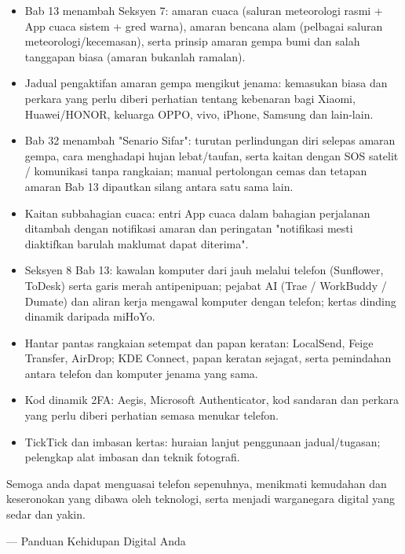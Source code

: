 
\begin{itemize}
  \item Bab 13 menambah Seksyen 7: amaran cuaca (saluran meteorologi rasmi + App cuaca sistem + gred warna), amaran bencana alam (pelbagai saluran meteorologi/kecemasan), serta prinsip amaran gempa bumi dan salah tanggapan biasa (amaran bukanlah ramalan).
  \item Jadual pengaktifan amaran gempa mengikut jenama: kemasukan biasa dan perkara yang perlu diberi perhatian tentang kebenaran bagi Xiaomi, Huawei/HONOR, keluarga OPPO, vivo, iPhone, Samsung dan lain-lain.
  \item Bab 32 menambah "Senario Sifar": turutan perlindungan diri selepas amaran gempa, cara menghadapi hujan lebat/taufan, serta kaitan dengan SOS satelit / komunikasi tanpa rangkaian; manual pertolongan cemas dan tetapan amaran Bab 13 dipautkan silang antara satu sama lain.
  \item Kaitan subbahagian cuaca: entri App cuaca dalam bahagian perjalanan ditambah dengan notifikasi amaran dan peringatan "notifikasi mesti diaktifkan barulah maklumat dapat diterima".
\end{itemize}


\begin{itemize}
  \item Seksyen 8 Bab 13: kawalan komputer dari jauh melalui telefon (Sunflower, ToDesk) serta garis merah antipenipuan; pejabat AI (Trae / WorkBuddy / Dumate) dan aliran kerja mengawal komputer dengan telefon; kertas dinding dinamik daripada miHoYo.
  \item Hantar pantas rangkaian setempat dan papan keratan: LocalSend, Feige Transfer, AirDrop; KDE Connect, papan keratan sejagat, serta pemindahan antara telefon dan komputer jenama yang sama.
  \item Kod dinamik 2FA: Aegis, Microsoft Authenticator, kod sandaran dan perkara yang perlu diberi perhatian semasa menukar telefon.
  \item TickTick dan imbasan kertas: huraian lanjut penggunaan jadual/tugasan; pelengkap alat imbasan dan teknik fotografi.
\end{itemize}

Semoga anda dapat menguasai telefon sepenuhnya, menikmati kemudahan dan keseronokan yang dibawa oleh teknologi, serta menjadi warganegara digital yang sedar dan yakin.

— Panduan Kehidupan Digital Anda
